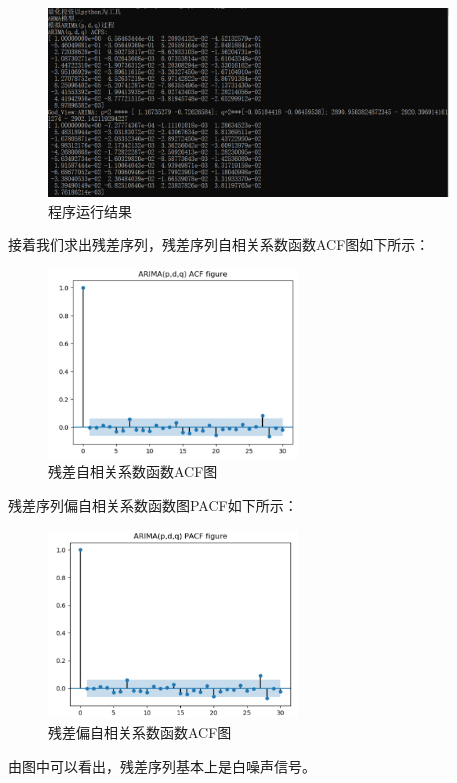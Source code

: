 \documentclass{article}
\begin{document}
\begin{figure}[H]
	\caption{程序运行结果}
	\label{f000019}
	\centering
	\includegraphics[height=5cm]{images/f000019}
\end{figure}
接着我们求出残差序列，残差序列自相关系数函数ACF图如下所示：
\begin{figure}[H]
	\caption{残差自相关系数函数ACF图}
	\label{f000020}
	\centering
	\includegraphics[height=5cm]{images/f000020}
\end{figure}
残差序列偏自相关系数函数图PACF如下所示：
\begin{figure}[H]
	\caption{残差偏自相关系数函数ACF图}
	\label{f000021}
	\centering
	\includegraphics[height=5cm]{images/f000021}
\end{figure}
由图中可以看出，残差序列基本上是白噪声信号。
\end{document}
